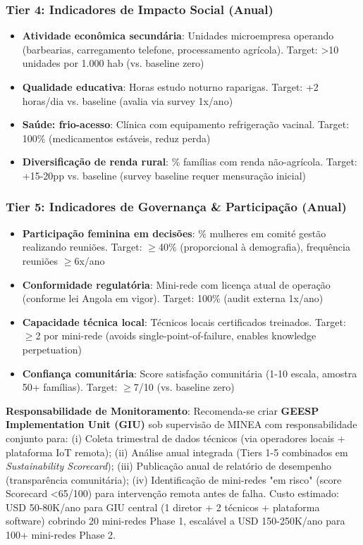 \documentclass[12pt, a4paper]{article}
\begin{document}
\subsubsection{Tier 4: Indicadores de Impacto Social (Anual)}
\begin{itemize}
\item \textbf{Atividade econômica secundária}: Unidades microempresa operando (barbearias, carregamento telefone, processamento agrícola). Target: >10 unidades por 1.000 hab (vs. baseline zero)
\item \textbf{Qualidade educativa}: Horas estudo noturno raparigas. Target: +2 horas/dia vs. baseline (avalia via survey 1x/ano)
\item \textbf{Saúde: frio-acesso}: Clínica com equipamento refrigeração vacinal. Target: 100\% (medicamentos estáveis, reduz perda)
\item \textbf{Diversificação de renda rural}: \% famílias com renda não-agrícola. Target: +15-20pp vs. baseline (survey baseline requer mensuração inicial)
\end{itemize}

\subsubsection{Tier 5: Indicadores de Governança \& Participação (Anual)}
\begin{itemize}
\item \textbf{Participação feminina em decisões}: \% mulheres em comité gestão realizando reuniões. Target: $\geq$40\% (proporcional à demografia), frequência reuniões $\geq$6x/ano
\item \textbf{Conformidade regulatória}: Mini-rede com licença atual de operação (conforme lei Angola em vigor). Target: 100\% (audit externa 1x/ano)
\item \textbf{Capacidade técnica local}: Técnicos locais certificados treinados. Target: $\geq$2 por mini-rede (avoids single-point-of-failure, enables knowledge perpetuation)
\item \textbf{Confiança comunitária}: Score satisfação comunitária (1-10 escala, amostra 50+ famílias). Target: $\geq$7/10 (vs. baseline zero)
\end{itemize}


\textbf{Responsabilidade de Monitoramento}: Recomenda-se criar 
\textbf{GEESP Implementation Unit (GIU)} sob supervisão de MINEA com responsabilidade conjunto para: (i) Coleta trimestral de dados técnicos (via operadores locais + plataforma IoT remota); (ii) Análise anual integrada (Tiers 1-5 combinados em \textit{Sustainability Scorecard}); (iii) Publicação anual de relatório de desempenho (transparência comunitária); (iv) Identificação de mini-redes "em risco" (score Scorecard <65/100) para intervenção remota antes de falha. Custo estimado: USD 50-80K/ano para GIU central (1 diretor + 2 técnicos + plataforma software) cobrindo 20 mini-redes Phase 1, escalável a USD 150-250K/ano para 100+ mini-redes Phase 2.
\end{document}
